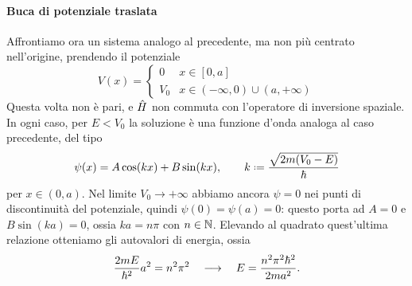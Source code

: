 \paragraph{Buca di potenziale traslata}
Affrontiamo ora un sistema analogo al precedente, ma non più centrato nell'origine, prendendo il potenziale
\begin{equation}
	V(x)=
	\begin{cases}
		0	&x\in[0,a]\\
		V_0	&x\in(-\infty,0)\cup(a,+\infty)
	\end{cases}
	\label{eq:buca-potenziale-traslata}
\end{equation}
Questa volta non è pari, e $\hat{H}$ non commuta con l'operatore di inversione spaziale.
In ogni caso, per $E<V_0$ la soluzione è una funzione d'onda analoga al caso precedente, del tipo
\begin{equation}
	\psi(x)=A\cos(kx)+B\sin(kx),\qquad k\defeq\frac{\sqrt{2m(V_0-E)}}{\hbar}
\end{equation}
per $x\in(0,a)$.
Nel limite $V_0\to+\infty$ abbiamo ancora $\psi=0$ nei punti di discontinuità del potenziale, quindi $\psi(0)=\psi(a)=0$: questo porta ad $A=0$ e $B\sin(ka)=0$, ossia $ka=n\pi$ con $n\in\mathbb{N}$.
Elevando al quadrato quest'ultima relazione otteniamo gli autovalori di energia, ossia
\begin{equation}
	\frac{2mE}{\hbar^2}a^2=n^2\pi^2\quad\longrightarrow\quad E=\frac{n^2\pi^2\hbar^2}{2ma^2}.
\end{equation}

